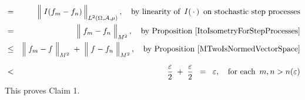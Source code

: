 \begin{enumerate}
\begin{eqnarray*}
	& = &
		\left\Vert\; I(f_{m} \overset{{\color{white}.}}{-} f_{n}) \,\right\Vert_{L^{2}(\Omega,\mathcal{A},\mu)},
		\quad
		\textnormal{by linearity of \,$I(\,\cdot\,)$\, on stochastic step processes}
	\\
	& = &
		\left\Vert\; f_{m} \overset{{\color{white}.}}{-} f_{n} \;\right\Vert_{M^{2}},
		\quad
		\textnormal{by Proposition \ref{ItoIsometryForStepProcesses}}
	\\
	& \leq &
		\left\Vert\; f_{m} \overset{{\color{white}.}}{-} f \;\right\Vert_{M^{2}}
		\; + \;
		\left\Vert\; f \overset{{\color{white}.}}{-} f_{n} \;\right\Vert_{M^{2}},
		\quad
		\textnormal{by Proposition \ref{MTwoIsNormedVectorSpace}}
	\\
	& \overset{{\color{white}\textnormal{\Large$1$}}}{<} &
		\dfrac{\varepsilon}{2} \; + \; \dfrac{\varepsilon}{2}
	\;\; = \;\;
		\varepsilon,
	\quad
	\textnormal{for each \,$m, n > n(\varepsilon)$}
	\end{eqnarray*}
	This proves Claim 1.
	

\end{enumerate}
